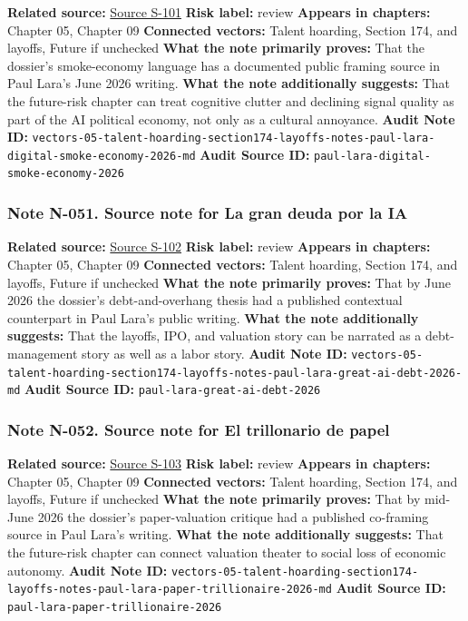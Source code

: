 \documentclass[
  american,
  11pt,
  letterpaper,
]{article}
\begin{document}
\textbf{Related source:}
\hyperref[source-s-101-la-econom-a-del-humo-digital]{Source S-101}
\textbf{Risk label:} review \textbf{Appears in chapters:} Chapter 05,
Chapter 09 \textbf{Connected vectors:} Talent hoarding, Section 174, and
layoffs, Future if unchecked \textbf{What the note primarily proves:}
That the dossier's smoke-economy language has a documented public
framing source in Paul Lara's June 2026 writing. \textbf{What the note
additionally suggests:} That the future-risk chapter can treat cognitive
clutter and declining signal quality as part of the AI political
economy, not only as a cultural annoyance. \textbf{Audit Note ID:}
\texttt{vectors-05-talent-hoarding-section174-layoffs-notes-paul-lara-digital-smoke-economy-2026-md}
\textbf{Audit Source ID:} \texttt{paul-lara-digital-smoke-economy-2026}

\subsubsection{Note N-051. Source note for La gran deuda por la
IA}\label{note-n-051-vectors-05-talent-hoarding-section174-layoffs-notes-paul-lara-great-ai-debt-2026-md}

\textbf{Related source:}
\hyperref[source-s-102-la-gran-deuda-por-la-ia]{Source S-102}
\textbf{Risk label:} review \textbf{Appears in chapters:} Chapter 05,
Chapter 09 \textbf{Connected vectors:} Talent hoarding, Section 174, and
layoffs, Future if unchecked \textbf{What the note primarily proves:}
That by June 2026 the dossier's debt-and-overhang thesis had a published
contextual counterpart in Paul Lara's public writing. \textbf{What the
note additionally suggests:} That the layoffs, IPO, and valuation story
can be narrated as a debt-management story as well as a labor story.
\textbf{Audit Note ID:}
\texttt{vectors-05-talent-hoarding-section174-layoffs-notes-paul-lara-great-ai-debt-2026-md}
\textbf{Audit Source ID:} \texttt{paul-lara-great-ai-debt-2026}

\subsubsection{Note N-052. Source note for El trillonario de
papel}\label{note-n-052-vectors-05-talent-hoarding-section174-layoffs-notes-paul-lara-paper-trillionaire-2026-md}

\textbf{Related source:}
\hyperref[source-s-103-el-trillonario-de-papel]{Source S-103}
\textbf{Risk label:} review \textbf{Appears in chapters:} Chapter 05,
Chapter 09 \textbf{Connected vectors:} Talent hoarding, Section 174, and
layoffs, Future if unchecked \textbf{What the note primarily proves:}
That by mid-June 2026 the dossier's paper-valuation critique had a
published co-framing source in Paul Lara's writing. \textbf{What the
note additionally suggests:} That the future-risk chapter can connect
valuation theater to social loss of economic autonomy. \textbf{Audit
Note ID:}
\texttt{vectors-05-talent-hoarding-section174-layoffs-notes-paul-lara-paper-trillionaire-2026-md}
\textbf{Audit Source ID:} \texttt{paul-lara-paper-trillionaire-2026}
\end{document}

